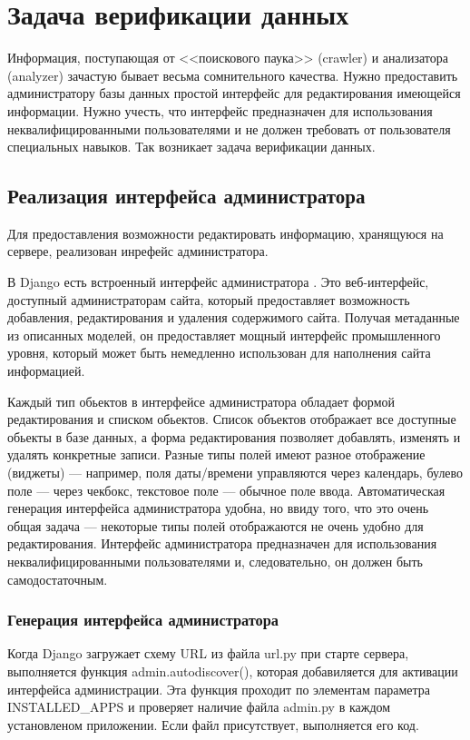 \section{Задача верификации данных}

Информация, поступающая от <<поискового паука>> (crawler) и анализатора (analyzer) зачастую бывает весьма сомнительного качества. Нужно предоставить администратору базы данных простой интерфейс для редактирования имеющейся информации. Нужно учесть, что интерфейс предназначен для использования неквалифицированными пользователями и не должен требовать от пользователя специальных навыков. Так возникает задача верификации данных.

\subsection{Реализация интерфейса администратора}

Для предоставления возможности редактировать информацию, хранящуюся на сервере, реализован инрефейс администратора.

В Django есть встроенный интерфейс администратора \cite{doc-admin, djbook-admin}. Это веб-интерфейс, доступный администраторам сайта, который предоставляет возможность добавления, редактирования и удаления содержимого сайта. Получая метаданные из описанных моделей, он предоставляет мощный интерфейс промышленного уровня, который может быть немедленно использован для наполнения сайта информацией.

Каждый тип обьектов в интерфейсе администратора обладает формой редактирования и списком обьектов. Список объектов отображает все доступные обьекты в базе данных, а форма редактирования позволяет добавлять, изменять и удалять конкретные записи. 
Разные типы полей имеют разное отображение (виджеты) --- например, поля даты/времени управляются через календарь, булево поле --- через чекбокс, текстовое поле --- обычное поле ввода. 
Автоматическая генерация интерфейса администратора удобна, но ввиду того, что это очень общая задача --- некоторые типы полей отображаются не очень удобно для редактирования. Интерфейс администратора предназначен для использования неквалифицированными пользователями и, следовательно, он должен быть самодостаточным.

\subsubsection{Генерация интерфейса администратора}

Когда Django загружает схему URL из файла url.py  при старте сервера, выполняется функция admin.autodiscover(), которая добавиляется для активации интерфейса администрации. Эта функция проходит по элементам параметра INSTALLED\_APPS и проверяет наличие файла admin.py в каждом установленом приложении. Если файл присутствует, выполняется его код. 

